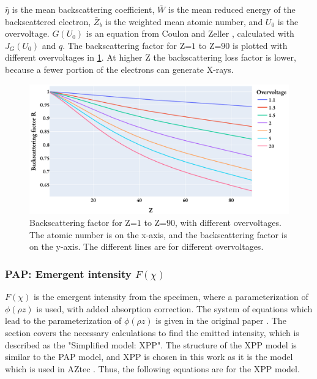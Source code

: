 $\bar{\eta}$ is the mean backscattering coefficient, $\bar{W}$ is the mean reduced energy of the backscattered electron, $\bar{Z}_b$ is the weighted mean atomic number, and $U_0$ is the overvoltage.
$G(U_0)$ is an equation from Coulon and Zeller \cite[Reference 28]{pap_1991}, calculated with $J_G(U_0)$ and $q$.
The backscattering factor for Z=$1$ to Z=$90$ is plotted with different overvoltages in \cref{fig:PAP:backscattering_factor}.
At higher Z the backscattering loss factor is lower, because a fewer portion of the electrons can generate X-rays.


\begin{figure}[htbp]
    \centering
    \includegraphics[width=0.8\linewidth]{figures/PAP_backscattering_factor.pdf}
    \caption{
        Backscattering factor for Z=$1$ to Z=$90$, with different overvoltages.
        The atomic number is on the x-axis, and the backscattering factor is on the y-axis.
        The different lines are for different overvoltages.
    }
    \label{fig:PAP:backscattering_factor}
\end{figure}





\subsubsection{PAP: Emergent intensity $F(\chi)$}
\label{sec:theory:quantitative:pap:emergent_intensity}

$F(\chi)$ is the emergent intensity from the specimen, where a parameterization of $\phi(\rho z)$ is used, with added absorption correction.
The system of equations which lead to the parameterization of $\phi(\rho z)$ is given in the original paper \cite{pap_1991}.
The section covers the necessary calculations to find the emitted intensity, which is described as the "Simplified model: XPP".
The structure of the XPP model is similar to the PAP model, and XPP is chosen in this work as it is the model which is used in AZtec \cite{oxford_blog_XPP}.
Thus, the following equations are for the XPP model.


